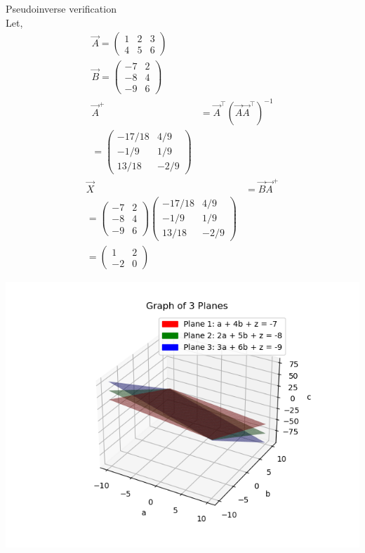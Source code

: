 \documentclass[journal]{IEEEtran}
\begin{document}
 Pseudoinverse verification\\
Let,
\begin{align}
\Vec{A} = \begin{pmatrix}1 & 2 & 3 \\ 4 & 5 & 6\end{pmatrix}\\
\Vec{B} = \begin{pmatrix}-7 & 2 \\ -8 & 4 \\ -9 & 6\end{pmatrix} \\
\Vec{A}^+ &= \Vec{A}^\top (\Vec{A}\Vec{A}^\top)^{-1} \\  
= \begin{pmatrix}
-17/18 & 4/9 \\
-1/9 & 1/9 \\
13/18 & -2/9
\end{pmatrix} 
\end{align}
 \begin{align}
\Vec{X} &= \Vec{B}\Vec{A}^+ \\  
= \begin{pmatrix}-7 & 2 \\ -8 & 4 \\ -9 & 6\end{pmatrix} 
\begin{pmatrix}-17/18 & 4/9 \\ -1/9 & 1/9 \\ 13/18 & -2/9\end{pmatrix} \\ 
=\begin{pmatrix}1 & 2 \\ -2 & 0\end{pmatrix} 
\end{align}

    \centering
    \includegraphics[width=\columnwidth, height=0.8\textheight, keepaspectratio]{figs/Figure_13.png}  
\end{document}
